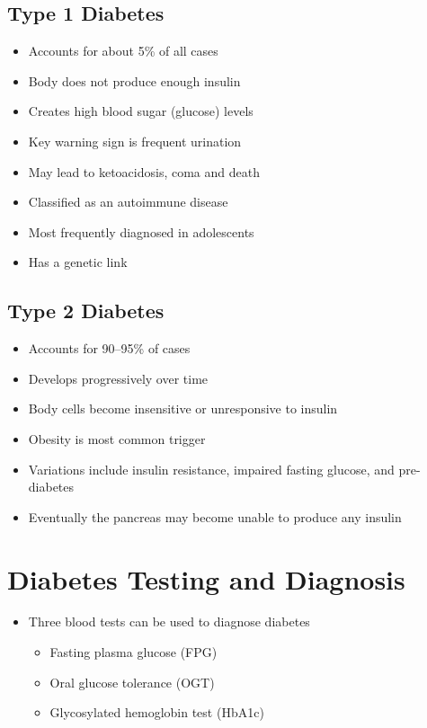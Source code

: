 \documentclass[title={Chapter 4}]{fdsn201notes}
\begin{document}
\subsection{Type 1 Diabetes}\label{subsec:type-1-diabetes}
\begin{itemize}
	\item Accounts for about 5\% of all cases
	\item Body does not produce enough insulin
	\item Creates high blood sugar (glucose) levels
	\item Key warning sign is frequent urination
	\item May lead to ketoacidosis, coma and death
	\item Classified as an autoimmune disease
	\item Most frequently diagnosed in adolescents
	\item Has a genetic link
\end{itemize}

\subsection{Type 2 Diabetes}\label{subsec:type-2-diabetes}
\begin{itemize}
	\item Accounts for 90--95\% of cases
	\item Develops progressively over time
	\item Body cells become insensitive or unresponsive to insulin
	\item Obesity is most common trigger
	\item Variations include insulin resistance, impaired fasting glucose, and pre-diabetes
	\item Eventually the pancreas may become unable to produce any insulin
\end{itemize}

\section{Diabetes Testing and Diagnosis}\label{sec:diabetes-testing-and-diagnosis}
\begin{itemize}
	\item Three blood tests can be used to diagnose diabetes
	\begin{itemize}
		\item Fasting plasma glucose (FPG)
		\item Oral glucose tolerance (OGT)
		\item Glycosylated hemoglobin test (HbA1c)
	\end{itemize}
\end{itemize}
\end{document}
